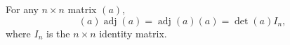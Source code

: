 For any $n \times n$ matrix $(a)$,
$$(a)\operatorname{adj}(a) = \operatorname{adj}(a)(a) = \det(a) I_n,$$
where $I_n$ is the $n \times n$ identity matrix.
